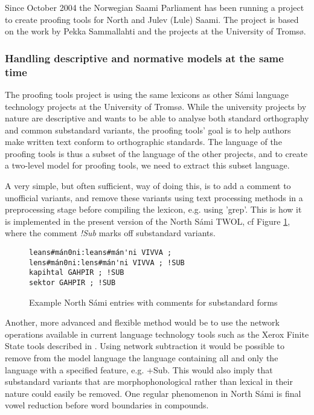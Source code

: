 \documentclass[a4paper,english]{article}
\begin{document}
Since October 2004 the Norwegian Saami Parliament has been running a project to create proofing tools for North and Julev (Lule) Saami. The project is based on the work by Pekka Sammallahti and the projects at the University of Tromsø.

\subsubsection{Handling descriptive and normative models at the same time}


The proofing tools project is using the same lexicons as other Sámi language technology projects at the University of Tromsø. While the university projects by nature are descriptive and wants to be able to analyse both standard orthography and common substandard variants, the proofing tools' goal is to help authors make written text conform to orthographic standards. The language of the proofing tools is thus a subset of the language of the other projects, and to create a two-level model for proofing tools, we need to extract this subset language.

A very simple, but often sufficient, way of doing this, is to add a comment to unofficial variants, and remove these variants using text processing methods in a preprocessing stage before compiling the lexicon, e.g. using 'grep'. This is how it is implemented in the present version of the North Sámi TWOL, cf Figure \ref{sublex}, where the comment \textit{!Sub} marks off substandard variants.

\begin{figure}[htbp]
\begin{center}
\begin{verbatim}
leans#mán0ni:leans#mán'ni VIVVA ;
lens#mán0ni:lens#mán'ni VIVVA ; !SUB
kapihtal GAHPIR ; !SUB
sektor GAHPIR ; !SUB
\end{verbatim}
\caption{Example North Sámi entries with comments for substandard forms}
\label{sublex}
\end{center}
\end{figure}


Another, more advanced and flexible method would be to use the network operations available in current language technology tools such as the Xerox Finite State tools described in \cite{Beesley03}. Using network subtraction it would be possible to remove from the model language the language containing all and only the language with a specified feature, e.g. +Sub. This would also imply that substandard variants that are morphophonological rather than lexical in their nature could easily be removed. One regular phenomenon in North Sámi is final vowel reduction before word boundaries in compounds.
\end{document}

